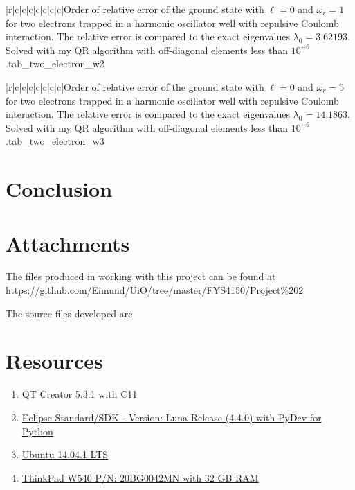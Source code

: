 \documentclass[11pt,english,a4paper]{article}
\begin{document}
\begin{flushleft}
\begin{tabell}{|r|c|c|c|c|c|c|c|}{\small}{}{}{Order of relative error of the ground state with $\ell = 0$ and $\omega_r = 1$ for two electrons trapped in a harmonic oscillator well with repulsive Coulomb interaction. The relative error is compared to the exact eigenvalues  $\lambda_0 = 3.62193$. Solved with my QR algorithm with off-diagonal elements less than $10^{-6}$.}{tab_two_electron_w2}
\end{tabell}

\begin{tabell}{|r|c|c|c|c|c|c|c|}{\small}{}{}{Order of relative error of the ground state with $\ell = 0$ and $\omega_r = 5$ for two electrons trapped in a harmonic oscillator well with repulsive Coulomb interaction. The relative error is compared to the exact eigenvalues  $\lambda_0 = 14.1863$. Solved with my QR algorithm with off-diagonal elements less than $10^{-6}$.}{tab_two_electron_w3}
\end{tabell}

\newpage

\section{Conclusion}

\section{Attachments}

The files produced in working with this project can be found at \href{https://github.com/Eimund/UiO/tree/master/FYS4150/Project\%202}{https://github.com/Eimund/UiO/tree/master/FYS4150/Project\%202} \linebreak

The source files developed are

\section{Resources}

\begin{enumerate}
\item{\href{http://qt-project.org/downloads}{QT Creator 5.3.1 with C11}}
\item{\href{https://www.eclipse.org/downloads/}{Eclipse Standard/SDK  - Version: Luna Release (4.4.0) with PyDev for Python}}
\item{\href{http://www.ubuntu.com/download/desktop}{Ubuntu 14.04.1 LTS}}
\item{\href{http://shop.lenovo.com/no/en/laptops/thinkpad/w-series/w540/#tab-reseller}{ThinkPad W540 P/N: 20BG0042MN with 32 GB RAM}}
\end{enumerate}


\end{flushleft}
\end{document}

